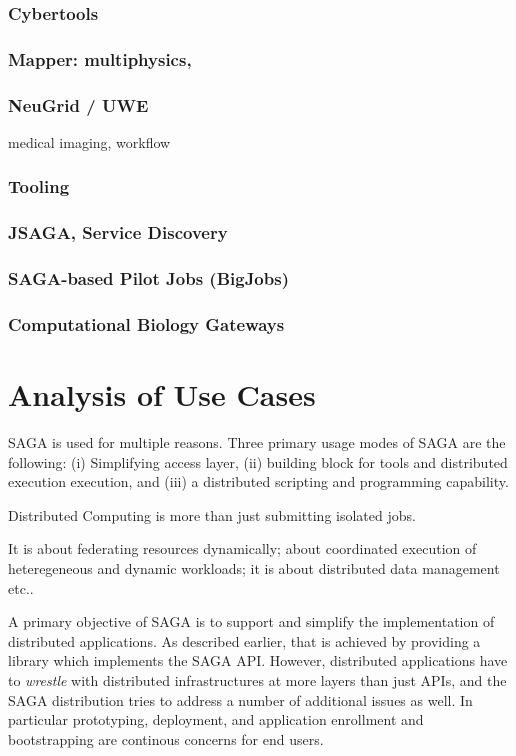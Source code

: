 \documentclass[12pt]{article}
\begin{document}
\subsubsection*{Cybertools} 
\subsubsection*{Mapper: multiphysics,}
\subsubsection*{NeuGrid / UWE} medical imaging, workflow

\subsubsection{Tooling}
   \subsubsection*{JSAGA, Service Discovery}
   \subsubsection*{SAGA-based Pilot Jobs (BigJobs)}
   \subsubsection*{Computational Biology Gateways}

\section{Analysis of Use Cases}

SAGA is used for multiple reasons. Three primary usage modes of SAGA
are the following: (i) Simplifying access layer, (ii) building block
for tools and distributed execution execution, and (iii) a distributed
scripting and programming capability.

Distributed Computing is more than just submitting isolated jobs.

It is about federating resources dynamically; about coordinated
execution of heteregeneous and dynamic workloads; it is about
distributed data management etc..


A primary objective of SAGA is to support and simplify the
implementation of distributed applications.  As described earlier,
that is achieved by providing a library which implements the SAGA API.
However, distributed applications have to {\it wrestle} with
distributed infrastructures at more layers than just APIs, and the
SAGA distribution tries to address a number of additional issues as
well. In particular prototyping, deployment, and application
enrollment and bootstrapping are continous concerns for end users.
\end{document}
